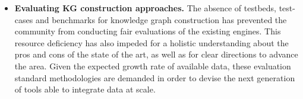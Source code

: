 \begin{itemize}
    \item \textbf{Evaluating KG construction approaches.} The absence of testbeds, test-cases and benchmarks for knowledge graph construction has prevented the community from conducting fair evaluations of the existing engines. This resource deficiency has also impeded for a holistic understanding about the pros and cons of the state of the art, as well as for clear directions to advance the area. Given the expected growth rate of available data, these evaluation standard methodologies are demanded in order to devise the next generation of tools able to integrate data at scale.
\end{itemize}